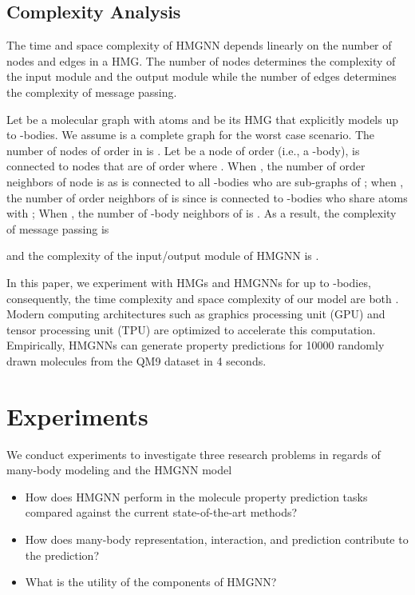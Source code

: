 \documentclass[conference]{IEEEtran}
\begin{document}
\subsection{Complexity Analysis}

The time and space complexity of HMGNN depends linearly on the number of nodes and edges in a HMG. The number of nodes determines the complexity of the input module and the output module while the number of edges determines the complexity of message passing. 

Let  be a molecular graph with  atoms and  be its HMG that explicitly models up to -bodies. We assume  is a complete graph for the worst case scenario. The number of nodes of order  in  is . Let  be a node of order  (i.e., a -body),  is connected to nodes that are of order  where . When , the number of  order neighbors of node  is  as  is connected to all -bodies who are sub-graphs of ; when , the number of order  neighbors of  is  since  is connected to -bodies who share  atoms with ; When , the number of -body neighbors of  is . As a result, the complexity of message passing is 

and the complexity of the input/output module of HMGNN is .

In this paper, we experiment with HMGs and HMGNNs for up to -bodies, consequently, the time complexity and space complexity of our model are both . Modern computing architectures such as graphics processing unit (GPU) and tensor processing unit (TPU) are optimized to accelerate this computation. Empirically, HMGNNs can generate property predictions for 10000 randomly drawn molecules from the QM9 dataset in 4 seconds.

\section{Experiments}

We conduct experiments to investigate three research problems in regards of many-body modeling and the HMGNN model
\begin{itemize}
    \item How does HMGNN perform in the molecule property prediction tasks compared against the current state-of-the-art methods?
    \item How does many-body representation, interaction, and prediction contribute to the prediction?
    \item What is the utility of the components of HMGNN?
\end{itemize}
\end{document}
